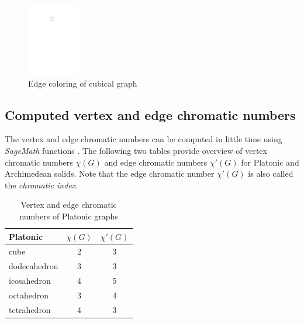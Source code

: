 \begin{figure}[H]
    \centering
    \includegraphics[width=0.2\textwidth]{../Resources/Figs/cubical_edg_colr.pdf}
    \caption{Edge coloring of cubical graph}
    \label{fig:cubical_edge_coloring}
\end{figure}

\subsection{Computed vertex and edge chromatic numbers}

The vertex and edge chromatic numbers can be computed in little time using \textit{SageMath} functions \cite{sagemath-chromatic-number} \cite{sagemath-chromatic-index}. The following two tables provide overview of vertex chromatic numbers $\chi(G)$  and edge chromatic numbers $\chi'(G)$ for Platonic and Archimedean solids. Note that the edge chromatic number $\chi'(G)$ is also called the \textit{chromatic index}.

\begin{table}[H]
    \centering
    \label{tab:platonic-chrom-nums}
    \begin{tabular}{|l|c|c|}
    \hline
    Platonic & $\chi(G)$ & $\chi'(G)$ \\
    \hline\hline
    cube & 2 & 3 \\
    \hline
    dodecahedron & 3 & 3 \\
    \hline
    icosahedron & 4 & 5 \\
    \hline
    octahedron & 3 & 4 \\
    \hline
    tetrahedron & 4 & 3 \\
    \hline
    \end{tabular}
    \caption{Vertex and edge chromatic numbers of Platonic graphs}
\end{table}

